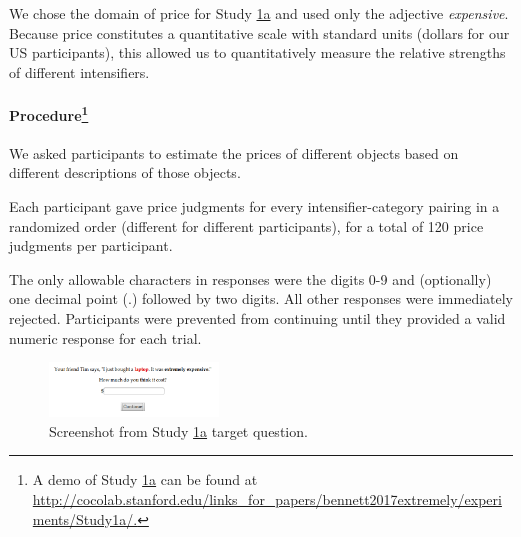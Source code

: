 \documentclass[10pt,letterpaper]{article}
\newcommand{\w}[1]{\emph{#1}}
\begin{document}
We chose the domain of price for Study \hyperref[sec:study1a]{1a} and used only the adjective \w{expensive}.
Because price constitutes a quantitative scale with standard units (dollars for our US participants), this allowed us to quantitatively measure the relative strengths of different intensifiers.

\paragraph{Procedure\footnote{A demo of Study \hyperref[sec:study1a]{1a} can be found at \url{http://cocolab.stanford.edu/links_for_papers/bennett2017extremely/experiments/Study1a/.}}}

We asked participants to estimate the prices of different objects based on different descriptions of those objects. 

Each participant gave price judgments for every intensifier-category pairing in a randomized order (different for different participants), for a total of 120 price judgments per participant.  

The only allowable characters in responses were the digits 0-9 and (optionally) one decimal point (.) followed by two digits. All other responses were immediately rejected.
Participants were prevented from continuing until they provided a valid numeric response for each trial.

\begin{figure}[ht]
\begin{center}
\includegraphics[width=0.4\textwidth]{exp1-q.png}
\end{center}
\caption{Screenshot from Study \hyperref[sec:study1a]{1a} target question.} 
\label{fig:question_study1a}
\end{figure}
\end{document}
